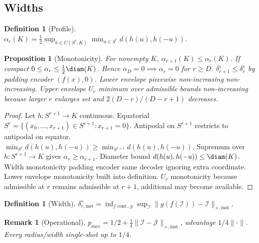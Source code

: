 \documentclass[11pt,a4paper]{article}
\newtheorem{proposition}[theorem]{Proposition}
\newtheorem{definition}[theorem]{Definition}
\newtheorem{remark}[theorem]{Remark}
\begin{document}
\subsection{Widths}
\begin{definition}[Profile]
$\alpha_r(K)=\frac12\sup_{h\in C(S^r,K)}\min_{u\in S^r}d(h(u),h(-u))$.
\end{definition}
\begin{proposition}[Monotonicity]
For nonempty $K$, $\alpha_{r+1}(K)\le\alpha_r(K)$. If compact $0\le\alpha_r\le\frac12\diam(K)$. Hence $\alpha_D=0\implies\alpha_r=0$ for $r\ge D$. $\delta_{r+1}^\diamond\le\delta_r^\diamond$ by padding encoder $(f(x),0)$. Lower envelope piecewise non-increasing non-increasing. Upper envelope $U_r$ minimum over admissible bounds non-increasing because larger $r$ enlarges set and $2(D-r)/(D-r+1)$ decreases.
\end{proposition}
\begin{proof}
Let $h:S^{r+1}\to K$ continuous.
Equatorial $S^r=\{(x_0,\dots,x_{r+1})\in S^{r+1}:x_{r+1}=0\}$.
Antipodal on $S^{r+1}$ restricts to antipodal on equator.
$\min_{S^r}d(h(u),h(-u))\ge\min_{S^{r+1}}d(h(u),h(-u))$.
Supremum over $h:S^{r+1}\to K$ gives $\alpha_r\ge\alpha_{r+1}$.
Diameter bound $d(h(u),h(-u))\le\diam(K)$.
Width monotonicity padding encoder same decoder ignoring extra coordinate.
Lower envelope monotonicity built into definition.
$U_r$ monotonicity because admissible at $r$ remains admissible at $r+1$, additional may become available.
\end{proof}
\begin{definition}[Width]
$\delta_{r,\mathrm{inst}}^\diamond=\inf_{f\text{ cont.},g}\sup_{\mathcal I}\|g(f(\mathcal I))-\mathcal I\|_{\diamond,\mathrm{inst}}$.
\end{definition}
\begin{remark}[Operational]
$p_{\mathrm{succ}}=1/2+\frac14\|\mathcal I-\mathcal J\|_{\diamond,\mathrm{inst}}$, advantage $1/4\|\cdot\|$. Every radius/width single-shot up to $1/4$.
\end{remark}
\end{document}
